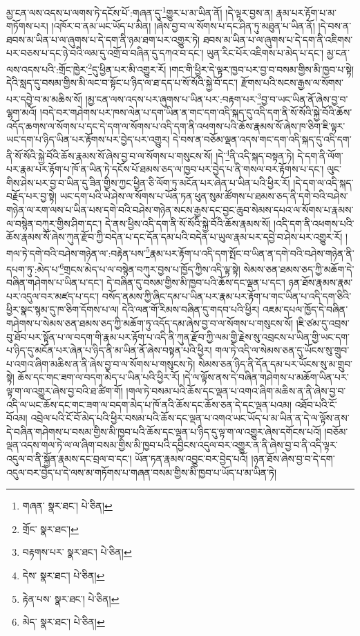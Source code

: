 མྱ་ངན་ལས་འདས་པ་ལགས་ཏེ་དངོས་པོ་:གཞན་དུ་\footnote{གཞན་  སྣར་ཐང་།  པེ་ཅིན། }གྱུར་པ་མ་ཡིན་ནོ། །དེ་ལྟར་བྱས་ན། རྣམ་པར་རྟོག་པ་མ་གཏོགས་པར། །འཁོར་བ་ནམ་ཡང་ཡོད་པ་མིན། །ཞེས་བྱ་བ་ལ་སོགས་པ་དང་ཤིན་ཏུ་མཐུན་པ་ཡིན་ནོ། །དེ་བས་ན་ཐབས་མ་ཡིན་པ་ལ་ཞུགས་པ་དེ་དག་ནི་ཉམ་ཐག་པར་འགྱུར་ཏེ། ཐབས་མ་ཡིན་པ་ལ་ཞུགས་པ་དེ་དག་ནི་འཇིགས་པར་བཅས་པ་དང་ཉེ་བའི་ལམ་དུ་འགྲོ་བ་བཞིན་དུ་དཀའ་བ་དང་། ཡུན་རིང་པོར་འཇིགས་པ་མེད་པ་དང་། མྱ་ངན་ལས་འདས་པའི་:གྲོང་ཁྱེར་\footnote{གྲོང་  སྣར་ཐང་། }དུ་ཕྱིན་པར་མི་འགྱུར་རོ། །གང་གི་ཕྱིར་དེ་ལྟར་ཁྱབ་པར་བྱ་བ་བསམ་གྱིས་མི་ཁྱབ་པ་སྟེ། དེའི་སླད་དུ་བསམ་གྱིས་མི་ལང་བ་སྟོང་པ་ཉིད་ལ་ཐ་དད་པ་སོ་སོའི་སྐྱེ་བོ་དང་། རྫོགས་པའི་སངས་རྒྱས་ལ་སོགས་པར་དབྱེ་བ་མ་མཆིས་སོ། །མྱ་ངན་ལས་འདས་པར་ཞུགས་པ་ཡིན་པར་:བརྟག་པར་\footnote{བརྟགས་པར་  སྣར་ཐང་།  པེ་ཅིན། }བྱ་བ་ཡང་ཡིན་ནོ་ཞེས་བྱ་བ་ལྷག་མའོ། །བདེ་བར་གཤེགས་པར་ཁས་ལེན་པ་དག་ཡིན་ན་གང་དག་འདི་སྐད་དུ་འདི་དག་ནི་སོ་སོའི་སྐྱེ་བོའི་ཆོས་འདོད་ཆགས་ལ་སོགས་པ་དང་དེ་དག་ལ་སོགས་པ་འདི་དག་ནི་འཕགས་པའི་ཆོས་རྣམས་སོ་ཞེས་ཁ་ཅིག་ཇི་ལྟར་ཡང་དག་པ་ཉིད་ཡིན་པར་རྟོགས་པར་བྱེད་པར་འགྱུར། དེ་བས་ན་བཅོམ་ལྡན་འདས་གང་དག་འདི་སྐད་དུ་འདི་དག་ནི་སོ་སོའི་སྐྱེ་བོའི་ཆོས་རྣམས་སོ་ཞེས་བྱ་བ་ལ་སོགས་པ་གསུངས་སོ། །དེ་\footnote{དེས་  སྣར་ཐང་།  པེ་ཅིན། }ནི་འདི་སྐད་བསྟན་ཏེ། དེ་དག་ནི་ལོག་པར་རྣམ་པར་རྟོག་པ་ཁོ་ན་ཡིན་ཏེ་དངོས་པོ་ཐམས་ཅད་ལ་ཁྱབ་པར་བྱེད་པ་ནི་གསལ་བར་རྟོགས་པ་དང་། ལུང་གིས་ཤེས་པར་བྱ་བ་ཡིན་དུ་ཟིན་གྱིས་ཀྱང་ཕྱིན་ཅི་ལོག་ཏུ་མངོན་པར་ཞེན་པ་ཡིན་པའི་ཕྱིར་རོ། །དེ་དག་ལ་འདི་སྐད་བརྗོད་པར་བྱ་སྟེ། ཡང་དག་པའི་ཡེ་ཤེས་ལ་སོགས་པ་ཡོན་ཏན་ཕུན་སུམ་ཚོགས་པ་ཐམས་ཅད་ནི་དགེ་བའི་བཤེས་གཉེན་ལ་རག་ལས་པ་ཡིན་པས་དགེ་བའི་བཤེས་གཉེན་སངས་རྒྱས་དང་བྱང་ཆུབ་སེམས་དཔའ་ལ་སོགས་པ་རྣམས་ལ་བསྙེན་བཀུར་གྱིས་ཤིག་དང་། དེ་ནས་ཕྱིས་འདི་དག་ནི་སོ་སོའི་སྐྱེ་བོའི་ཆོས་རྣམས་སོ། །འདི་དག་ནི་འཕགས་པའི་ཆོས་རྣམས་སོ་ཞེས་ཀུན་རྫོབ་ཀྱི་བདེན་པ་དང་དོན་དམ་པའི་བདེན་པ་ཡུལ་རྣམ་པར་དབྱེ་བ་ཤེས་པར་འགྱུར་རོ། །གལ་ཏེ་དགེ་བའི་བཤེས་གཉེན་ལ་:བརྟེན་པས་\footnote{རྟེན་པས་  སྣར་ཐང་།  པེ་ཅིན། }རྣམ་པར་རྟོག་པ་འདི་དག་སྤོང་བ་ཡིན་ན་དགེ་བའི་བཤེས་གཉེན་ནི་དཔག་ཏུ་:མེད་པ་\footnote{མེད་  སྣར་ཐང་།  པེ་ཅིན། }གྲངས་མེད་པ་ལ་བསྙེན་བཀུར་བྱས་པ་ཁྱོད་ཀྱིས་འདི་ལྟ་སྟེ། སེམས་ཅན་ཐམས་ཅད་ཀྱི་མཆོག་དེ་བཞིན་གཤེགས་པ་ཡིན་པ་དང་། དེ་བཞིན་དུ་བསམ་གྱིས་མི་ཁྱབ་པའི་ཆོས་དང་ལྡན་པ་དང་། ཉན་ཐོས་རྣམས་རྣམ་པར་འདུལ་བར་མཛད་པ་དང་། བསོད་ནམས་ཀྱི་ཞིང་དམ་པ་ཡིན་པར་རྣམ་པར་རྟོག་པ་གང་ཡིན་པ་འདི་དག་ཅིའི་ཕྱིར་སྣང་སྙམ་དུ་ཁ་ཅིག་དོགས་པ་ལ། དེའི་ལན་གོ་རིམས་བཞིན་དུ་གདབ་པའི་ཕྱིར། འཇམ་དཔལ་ཁྱོད་དེ་བཞིན་གཤེགས་པ་སེམས་ཅན་ཐམས་ཅད་ཀྱི་མཆོག་ཏུ་འདོད་དམ་ཞེས་བྱ་བ་ལ་སོགས་པ་གསུངས་སོ། །ཇི་ཙམ་དུ་འབྲས་བུ་ཐོབ་པར་སྟོན་པ་ལ་བདག་གི་རྣམ་པར་རྟོག་པ་འདི་ནི་ཀུན་རྫོབ་ཀྱི་ལམ་གྱི་རྗེས་སུ་འབྲངས་པ་ཡིན་གྱི་ཡང་དག་པ་ཉིད་དུ་མངོན་པར་ཞེན་པ་ཉིད་ནི་མ་ཡིན་ནོ་ཞེས་བསྟན་པའི་ཕྱིར། གལ་ཏེ་འདི་ལ་སེམས་ཅན་དུ་ཡོངས་སུ་གྲུབ་པ་འགའ་ཞིག་མཆིས་ན་ནི་ཞེས་བྱ་བ་ལ་སོགས་པ་གསུངས་ཏེ། སེམས་ཅན་ཉིད་ནི་དོན་དམ་པར་ཡོངས་སུ་མ་གྲུབ་སྟེ། ཆོས་དང་གང་ཟག་ལ་བདག་མེད་པ་ཡིན་པའི་ཕྱིར་རོ། །དེ་ལ་ལྟོས་ནས་དེ་བཞིན་གཤེགས་པ་མཆོག་ཡིན་པར་ལྟ་ག་ལ་འགྱུར་ཞེས་བྱ་བའི་ཐ་ཚིག་གོ། །གལ་ཏེ་བསམ་པའི་ཆོས་དང་ལྡན་པ་འགའ་ཞིག་མཆིས་ན་ནི་ཞེས་བྱ་བ་འདི་ལ་ཡང་ཆོས་དང་གང་ཟག་ལ་བདག་མེད་པ་ཁོ་ནའི་ཆོས་དང་ཆོས་ཅན་དེ་དང་ལྡན་པའམ། འཐོབ་པའི་ངོ་བོའམ། འབྲེལ་པའི་ངོ་བོ་མེད་པའི་ཕྱིར་བསམ་པའི་ཆོས་དང་ལྡན་པ་འགའ་ཡང་ཡོད་པ་མ་ཡིན་ན་དེ་ལ་ལྟོས་ནས་དེ་བཞིན་གཤེགས་པ་བསམ་གྱིས་མི་ཁྱབ་པའི་ཆོས་དང་ལྡན་པ་ཉིད་དུ་ལྟ་ག་ལ་འགྱུར་ཞེས་དགོངས་པའོ། །བཅོམ་ལྡན་འདས་གལ་ཏེ་ལ་ལ་ཞིག་བསམ་གྱིས་མི་ཁྱབ་པའི་དབྱིངས་འདུལ་བར་འགྱུར་ན་ནི་ཞེས་བྱ་བ་ནི་འདི་ལྟར་འདུལ་བ་ནི་སྐྱོན་རྣམས་དང་བྲལ་བ་དང་། ཡོན་ཏན་རྣམས་འབྱུང་བར་བྱེད་པའོ། །ཉན་ཐོས་ཞེས་བྱ་བ་དེ་དག་འདུལ་བར་བྱེད་པ་དེ་ལས་མ་གཏོགས་པ་གཞན་བསམ་གྱིས་མི་ཁྱབ་པ་ཡོད་པ་མ་ཡིན་ཏེ། 